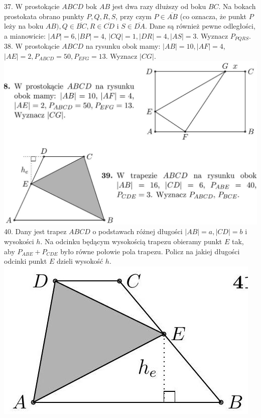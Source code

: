 \documentclass[10pt]{article}
\begin{document}
37. W prostokącie \(A B C D\) bok \(A B\) jest dwa razy dłuższy od boku \(B C\). Na bokach prostokata obrano punkty \(P, Q, R, S\), przy czym \(P \in \overline{A B}\) (co oznacza, że punkt \(P\) leży na boku \(A B), Q \in \overline{B C}, R \in \overline{C D}\) i \(S \in \overline{D A}\). Dane są również pewne odległości, a mianowicie: \(|A P|=6,|B P|=4\), \(|C Q|=1,|D R|=4,|A S|=3\). Wyznacz \(P_{P Q R S}\).\\
38. W prostokącie \(A B C D\) na rysunku obok mamy: \(|A B|=10,|A F|=4\), \(|A E|=2, P_{A B C D}=50, P_{E F G}=13\). Wyznacz \(|C G|\).\\
\includegraphics[max width=\textwidth, center]{2024_11_21_71f62bd117d375398909g-039(1)}\\
40. Dany jest trapez \(A B C D\) o podstawach różnej długości \(|A B|=a,|C D|=b\) i wysokości \(h\). Na odcinku będącym wysokością trapezu obieramy punkt \(E\) tak, aby \(P_{A B E}+P_{C D E}\) było równe połowie pola trapezu. Policz na jakiej długości odcinki punkt \(E\) dzieli wysokość \(h\).\\
\includegraphics[max width=\textwidth, center]{2024_11_21_71f62bd117d375398909g-040(1)}\\
\end{document}
